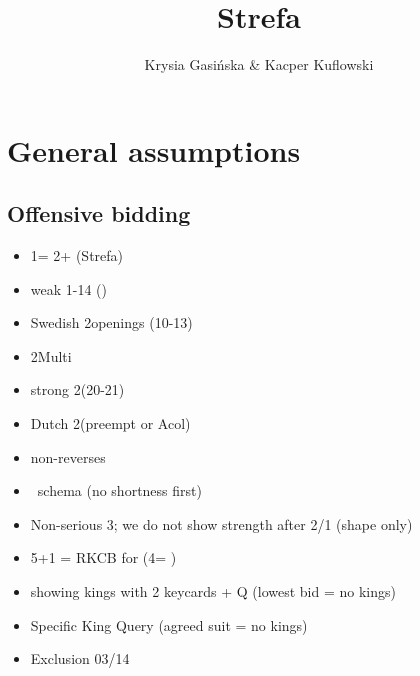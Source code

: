 \documentclass[12pt, a4paper]{report}
\title{\spades\clubs Strefa \xdiams\xhearts}
\author{Krysia Gasińska \& Kacper Kuflowski}
\begin{document}
\maketitle

\tableofcontents

\chapter*{\colorbox{Plum!30}{General assumptions}}
 {

        
    \section*{\colorbox{blue!30}{Offensive bidding}}
        \begin{itemize}
            \item 1\clubs = 2+ (Strefa)
            \item weak 1-14 ()
            \item Swedish 2\major openings (10-13)
            \item 2\diams Multi
            \item strong 2\nt (20-21)
            \item Dutch 2\clubs (\diams preempt or Acol)
            \item non-\gf reverses
            \item \hsf\ schema (no shortness first)
            \item Non-serious 3\nt; we do not show strength after 2/1 (shape only)
            \item 5\minor+1 = RKCB for \minor (4\nt = \nat)
            \item showing kings with 2 keycards + Q (lowest bid = no kings)
            \item Specific King Query (agreed suit = no kings)
            \item Exclusion 03/14
        \end{itemize}

}
\end{document}
